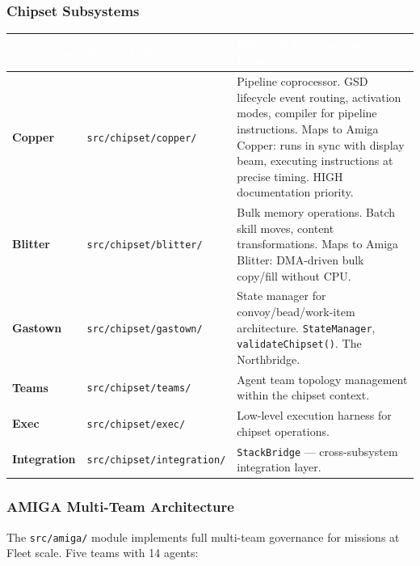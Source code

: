 \documentclass[11pt,letterpaper]{article}
\newcommand{\tableheader}[1]{\textbf{\sffamily\textcolor{white}{#1}}}
\begin{document}
\subsubsection{Chipset Subsystems}

\begin{center}
\begin{tabularx}{\textwidth}{L{2.5cm}L{3cm}X}
\toprule
{}
\tableheader{Subsystem} & \tableheader{Source Path} & \tableheader{Role and Documentation Priority} \\
\midrule
\textbf{Copper} & \texttt{src/chipset/copper/} & Pipeline coprocessor. GSD lifecycle event routing, activation modes, compiler for pipeline instructions. Maps to Amiga Copper: runs in sync with display beam, executing instructions at precise timing. HIGH documentation priority. \\
\textbf{Blitter} & \texttt{src/chipset/blitter/} & Bulk memory operations. Batch skill moves, content transformations. Maps to Amiga Blitter: DMA-driven bulk copy/fill without CPU. \\
\textbf{Gastown} & \texttt{src/chipset/gastown/} & State manager for convoy/bead/work-item architecture. \texttt{StateManager}, \texttt{validateChipset()}. The Northbridge. \\
\textbf{Teams} & \texttt{src/chipset/teams/} & Agent team topology management within the chipset context. \\
\textbf{Exec} & \texttt{src/chipset/exec/} & Low-level execution harness for chipset operations. \\
\textbf{Integration} & \texttt{src/chipset/integration/} & \texttt{StackBridge} --- cross-subsystem integration layer. \\
\bottomrule
\end{tabularx}
\end{center}

\subsubsection{AMIGA Multi-Team Architecture}

The \texttt{src/amiga/} module implements full multi-team governance for missions at Fleet scale. Five teams with 14 agents:
\end{document}
